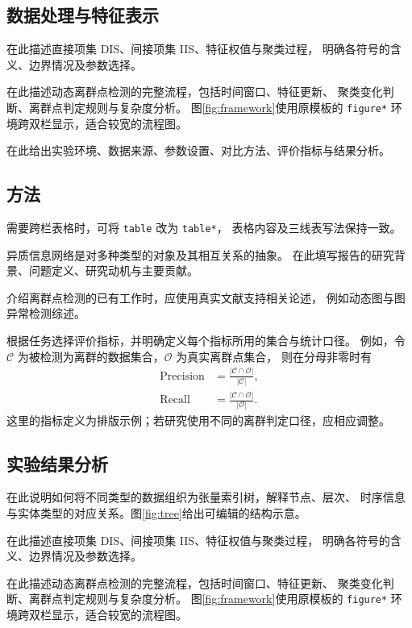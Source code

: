 \documentclass[sigconf,nonacm,screen]{acmart}
\begin{document}
\subsection{数据处理与特征表示}
\label{sec:task4-feature}
在此描述直接项集 DIS、间接项集 IIS、特征权值与聚类过程，
明确各符号的含义、边界情况及参数选择。

在此描述动态离群点检测的完整流程，包括时间窗口、特征更新、
聚类变化判断、离群点判定规则与复杂度分析。
图\ref{fig:framework}使用原模板的 \texttt{figure*} 环境跨双栏显示，适合较宽的流程图。

在此给出实验环境、数据来源、参数设置、对比方法、评价指标与结果分析。

\subsection{方法}
\label{sec:task4-method}
需要跨栏表格时，可将 \texttt{table} 改为 \texttt{table*}，
表格内容及三线表写法保持一致。

异质信息网络是对多种类型的对象及其相互关系的抽象。
在此填写报告的研究背景、问题定义、研究动机与主要贡献。

介绍离群点检测的已有工作时，应使用真实文献支持相关论述，
例如动态图与图异常检测综述\cite{akoglu2015}。

根据任务选择评价指标，并明确定义每个指标所用的集合与统计口径。
例如，令 $\mathcal C$ 为被检测为离群的数据集合，$\mathcal O$ 为真实离群点集合，
则在分母非零时有
\begin{equation}
  \begin{aligned}
    \operatorname{Precision}&=\frac{|\mathcal C\cap\mathcal O|}{|\mathcal C|},\\
    \operatorname{Recall}&=\frac{|\mathcal C\cap\mathcal O|}{|\mathcal O|}.
  \end{aligned}
  \label{eq:metrics}
\end{equation}
这里的指标定义为排版示例；若研究使用不同的离群判定口径，应相应调整。

\subsection{实验结果分析}
\label{sec:task4-result}
在此说明如何将不同类型的数据组织为张量索引树，解释节点、层次、
时序信息与实体类型的对应关系。图\ref{fig:tree}给出可编辑的结构示意。

在此描述直接项集 DIS、间接项集 IIS、特征权值与聚类过程，
明确各符号的含义、边界情况及参数选择。

在此描述动态离群点检测的完整流程，包括时间窗口、特征更新、
聚类变化判断、离群点判定规则与复杂度分析。
图\ref{fig:framework}使用原模板的 \texttt{figure*} 环境跨双栏显示，适合较宽的流程图。
\end{document}
